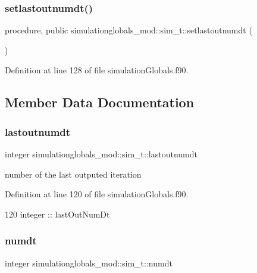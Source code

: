 \subsubsection{\texorpdfstring{setlastoutnumdt()}{setlastoutnumdt()}}
{\footnotesize\ttfamily procedure, public simulationglobals\+\_\+mod\+::sim\+\_\+t\+::setlastoutnumdt (\begin{DoxyParamCaption}{ }\end{DoxyParamCaption})}



Definition at line 128 of file simulation\+Globals.\+f90.



\subsection{Member Data Documentation}
\mbox{\label{structsimulationglobals__mod_1_1sim__t_a09270b8350c388b420492cd2209bb1dd}} 
\subsubsection{\texorpdfstring{lastoutnumdt}{lastoutnumdt}}
{\footnotesize\ttfamily integer simulationglobals\+\_\+mod\+::sim\+\_\+t\+::lastoutnumdt\hspace{0.3cm}{\ttfamily [private]}}



number of the last outputed iteration 



Definition at line 120 of file simulation\+Globals.\+f90.


\begin{DoxyCode}
120         \textcolor{keywordtype}{integer} :: lastOutNumDt
\end{DoxyCode}
\mbox{\label{structsimulationglobals__mod_1_1sim__t_acf2dd4822ebd48541ac6d018038b286a}} 
\subsubsection{\texorpdfstring{numdt}{numdt}}
{\footnotesize\ttfamily integer simulationglobals\+\_\+mod\+::sim\+\_\+t\+::numdt\hspace{0.3cm}{\ttfamily [private]}}



